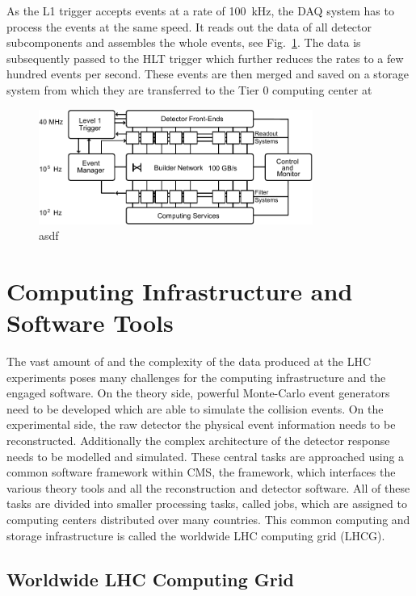 As the L1 trigger accepts events at a rate of \SI{100}{\kilo\hertz}, the DAQ
system has to process the events at the same speed. It reads out the data of all
detector subcomponents and assembles the whole events, see
Fig.~\ref{fig:cms:daq_system}. The data is subsequently passed to the HLT
trigger which further reduces the rates to a few hundred events per second.
These events are then merged and saved on a storage system from which they are
transferred to the Tier 0 computing center at \CERN 

\begin{figure}[h!tp]
    \centering
    \includegraphics[width=0.8\textwidth]{figures/cms_detector/cms_daq.pdf}\hfill
    \caption[The DAQ System of CMS]{asdf~\cite{Sphicas:2002gg}}
    \label{fig:cms:daq_system}
\end{figure}

\section{Computing Infrastructure and Software Tools}

The vast amount of and the complexity of the data produced at the LHC
experiments poses many challenges for the computing infrastructure and the
engaged software. On the theory side, powerful Monte-Carlo event generators need to be
developed which are able to simulate the collision events. On the experimental
side, the raw detector the physical event information needs to be reconstructed. Additionally the
complex architecture of the detector response needs to be modelled and
simulated. These central tasks are approached using a common software framework
within CMS, the \CMSSW framework, which interfaces the various theory tools and
all the reconstruction and detector software. All of these tasks are divided
into smaller processing tasks, called jobs, which are assigned to computing
centers distributed over many countries. This common computing and storage
infrastructure is called the worldwide LHC computing grid (LHCG).

\subsection{Worldwide LHC Computing Grid}

